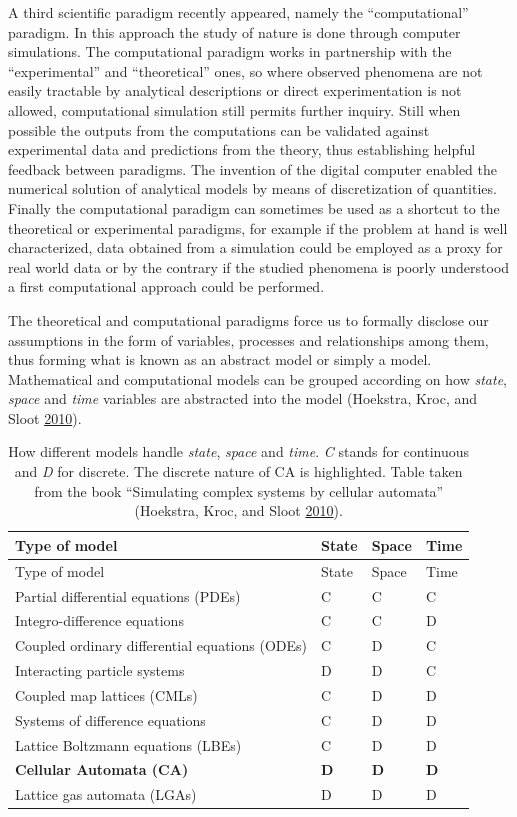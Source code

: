 \documentclass[
]{book}
\begin{document}
A third scientific paradigm recently appeared, namely the ``computational'' paradigm. In this approach the study of nature is done through computer simulations. The computational paradigm works in partnership with the ``experimental'' and ``theoretical'' ones, so where observed phenomena are not easily tractable by analytical descriptions or direct experimentation is not allowed, computational simulation still permits further inquiry. Still when possible the outputs from the computations can be validated against experimental data and predictions from the theory, thus establishing helpful feedback between paradigms. The invention of the digital computer enabled the numerical solution of analytical models by means of discretization of quantities. Finally the computational paradigm can sometimes be used as a shortcut to the theoretical or experimental paradigms, for example if the problem at hand is well characterized, data obtained from a simulation could be employed as a proxy for real world data or by the contrary if the studied phenomena is poorly understood a first computational approach could be performed.

The theoretical and computational paradigms force us to formally disclose our assumptions in the form of variables, processes and relationships among them, thus forming what is known as an abstract model or simply a model. Mathematical and computational models can be grouped according on how \emph{state}, \emph{space} and \emph{time} variables are abstracted into the model (Hoekstra, Kroc, and Sloot \protect\hyperlink{ref-hoekstra2010simulating}{2010}).

\begin{longtable}[]{@{}llll@{}}
\caption{\label{tab:models} How different models handle \emph{state}, \emph{space} and \emph{time}. \emph{C} stands for continuous and \emph{D} for discrete. The discrete nature of CA is highlighted.
Table taken from the book ``Simulating complex systems by cellular automata'' (Hoekstra, Kroc, and Sloot \protect\hyperlink{ref-hoekstra2010simulating}{2010}).}\tabularnewline
\toprule
Type of model & State & Space & Time\tabularnewline
\midrule
\endfirsthead
\toprule
Type of model & State & Space & Time\tabularnewline
\midrule
\endhead
Partial differential equations (PDEs) & C & C & C\tabularnewline
Integro-difference equations & C & C & D\tabularnewline
Coupled ordinary differential equations (ODEs) & C & D & C\tabularnewline
Interacting particle systems & D & D & C\tabularnewline
Coupled map lattices (CMLs) & C & D & D\tabularnewline
Systems of difference equations & C & D & D\tabularnewline
Lattice Boltzmann equations (LBEs) & C & D & D\tabularnewline
\textbf{Cellular Automata (CA)} & \textbf{D} & \textbf{D} & \textbf{D}\tabularnewline
Lattice gas automata (LGAs) & D & D & D\tabularnewline
\bottomrule
\end{longtable}
\end{document}
